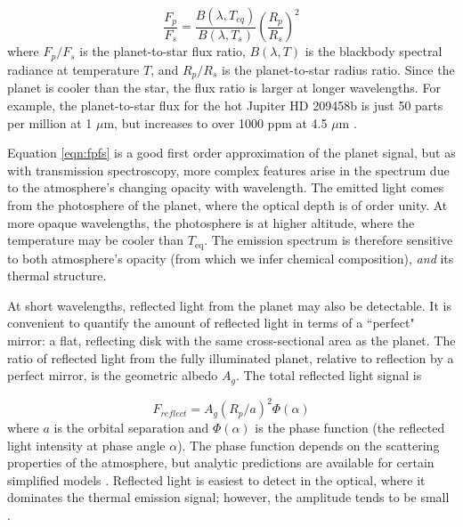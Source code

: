 \documentclass[graybox,natbib,nosecnum]{svmult}
\newcommand{\hbindex}[1]{\hl{#1}\index{#1}}  %
\begin{document}
\begin{equation}
\label{eqn:fpfs}
\frac{F_p}{F_s} = \frac{B(\lambda, T_{eq})}{B(\lambda, T_s)}\left(\frac{R_p}{R_s}\right)^2
\end{equation}
where $F_p/F_s$ is the planet-to-star flux ratio, $B(\lambda, T)$ is the blackbody spectral radiance at temperature $T$, and $R_p/R_s$ is the planet-to-star radius ratio. Since the planet is cooler than the star, the flux ratio is larger at longer wavelengths. For example, the planet-to-star flux for the hot Jupiter HD 209458b is just 50 parts per million at 1 $\mu$m, but increases to over 1000 ppm at 4.5 $\mu$m \citep{line16}.

Equation \ref{eqn:fpfs} is a good first order approximation of the planet signal, but as with transmission spectroscopy, more complex features arise in the spectrum due to the atmosphere's changing opacity with wavelength. The emitted light comes from the photosphere of the planet, where the optical depth is of order unity. At more opaque wavelengths, the photosphere is at higher altitude, where the temperature may be cooler than $T_\mathrm{eq}$. The emission spectrum is therefore sensitive to both atmosphere's opacity (from which we infer chemical composition), \emph{and} its thermal structure. 



At short wavelengths, reflected light from the planet may also be detectable. It is convenient to quantify the amount of reflected light in terms of a ``perfect" mirror: a flat, reflecting disk with the same cross-sectional area as the planet. The ratio of reflected light from the fully illuminated planet, relative to reflection by a perfect mirror, is the geometric albedo $A_g$. The total reflected light signal is

\begin{equation}
F_{reflect} = A_g(R_p/a)^2 \Phi(\alpha)
\end{equation}
where $a$ is the orbital separation and $\Phi(\alpha)$ is the phase function (the reflected light intensity at phase angle $\alpha$). The phase function depends on the scattering properties of the atmosphere, but analytic predictions are available for certain simplified models \citep[e.g.][]{madhu12}.  Reflected light is easiest to detect in the optical, where it dominates the thermal emission signal; however, the amplitude tends to be small \citep[typically less than 100 ppm;][]{angerhausen15}.
\end{document}
